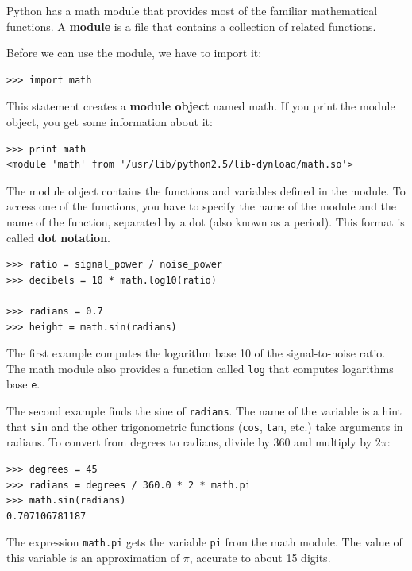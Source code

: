 \documentclass[10pt]{book}
\begin{document}
Python has a math module that provides most of the familiar
mathematical functions.  A {\bf module} is a file that contains a
collection of related functions.


Before we can use the module, we have to import it:

\beforeverb
\begin{verbatim}
>>> import math
\end{verbatim}
\afterverb
%
This statement creates a {\bf module object} named math.  If
you print the module object, you get some information about it:

\beforeverb
\begin{verbatim}
>>> print math
<module 'math' from '/usr/lib/python2.5/lib-dynload/math.so'>
\end{verbatim}
\afterverb
%
The module object contains the functions and variables defined in the
module.  To access one of the functions, you have to specify the name
of the module and the name of the function, separated by a dot (also
known as a period).  This format is called {\bf dot notation}.


\beforeverb
\begin{verbatim}
>>> ratio = signal_power / noise_power
>>> decibels = 10 * math.log10(ratio)

>>> radians = 0.7
>>> height = math.sin(radians)
\end{verbatim}
\afterverb
%
The first example computes the logarithm base 10 of the
signal-to-noise ratio.  The math module also provides a
function called {\tt log} that computes logarithms base {\tt e}.


The second example finds the sine of {\tt radians}.  The name of the
variable is a hint that {\tt sin} and the other trigonometric
functions ({\tt cos}, {\tt tan}, etc.)  take arguments in radians. To
convert from degrees to radians, divide by 360 and multiply by $2
\pi$:

\beforeverb
\begin{verbatim}
>>> degrees = 45
>>> radians = degrees / 360.0 * 2 * math.pi
>>> math.sin(radians)
0.707106781187
\end{verbatim}
\afterverb
%
The expression {\tt math.pi} gets the variable {\tt pi} from the math
module.  The value of this variable is an approximation
of $\pi$, accurate to about 15 digits.
\end{document}
